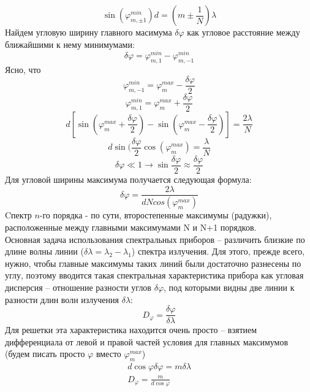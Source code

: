 \documentclass[__main__.tex]{subfiles}
\begin{document}
$$\sin(\varphi^{min}_{m, \pm1})d = (m \pm \frac{1}{N})\lambda$$
Найдем угловую ширину главного масимума $\delta\varphi$ как угловое расстояние между ближайшими к нему минимумами:
$$\delta\varphi = \varphi^{min}_{m, 1} - \varphi^{min}_{m, -1} $$
Ясно, что 
$$\varphi^{min}_{m, -1} = \varphi^{max}_{m} - \frac{\delta \varphi}{2}$$
$$\varphi^{min}_{m, 1} = \varphi^{max}_{m} + \frac{\delta\varphi}{2}$$
$$
d\left[\sin(\varphi^{max}_{m} + \frac{\delta\varphi}{2}) - \sin(\varphi^{max}_{m} - \frac{\delta\varphi}{2})\right] = \frac{2\lambda}{N}
$$
$$d\sin(\frac{\delta \varphi}{2} \cos(\varphi^{max}_m) = \frac{\lambda}{N}$$
$$\delta\varphi\ll1 \rightarrow \sin\frac{\delta\varphi}{2} \approx \frac{\delta\varphi}{2}$$
Для угловой ширины максимума получается следующая формула:
$$\delta\varphi = \frac{2\lambda}{dNcos(\varphi^{max}_m)}$$
Cпектр $n$-го порядка - по сути, второстепенные максимумы (радужки), расположенные между главными максимумами N и N+1 порядков.\\
Основная задача использования спектральных приборов – различить близкие по длине волны линии ($\delta \lambda = \lambda_2 - \lambda_1$) спектра излучения. Для этого, прежде всего, нужно, чтобы главные максимумы таких линий были достаточно разнесены по углу, поэтому вводится такая спектральная характеристика прибора как угловая дисперсия – отношение разности углов $\delta\varphi$, под которыми видны две линии к разности длин волн излучения $\delta\lambda$:
$$D_\varphi = \frac{\delta\varphi}{\delta\lambda}$$
Для решетки эта характеристика находится очень просто – взятием дифференциала от левой и правой частей условия для главных максимумов (будем писать просто $\varphi$ вместо $\varphi^{max}_m$)
\begin{gather*}
d\cos\varphi \delta\varphi = m\delta\lambda\\
D_\varphi = \frac{m}{d\cos \varphi}
\end{gather*}
\end{document}
